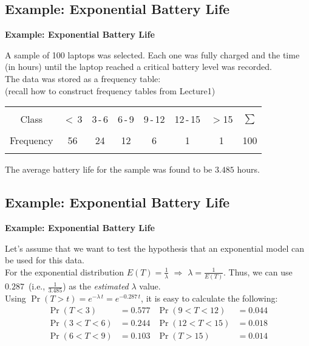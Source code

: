 \documentclass[compress]{beamer}        %
\makeatletter
\newcommand{\tcb}{\textcolor{beamer@blendedblue}}
\makeatother
\begin{document}
\subsection{Example: Exponential Battery Life}
\begin{frame}{\bf \tcb{Example: Exponential Battery Life}}

A sample of 100 laptops was selected. Each one was fully charged and the time (in hours) until the laptop reached a critical battery level was recorded.\\[0.8cm]

The data was stored as a frequency table:\\[0.1cm]
{\footnotesize(recall how to construct frequency tables from Lecture1)}
\begin{center}
\begin{tabular}{|c|cccccc|c|}
\hline
&&&&&&&\\[-0.3cm]
Class & $<$\,3 & 3\,-\,6 & 6\,-\,9 & 9\,-\,12 & 12\,-\,15 & $>$15 & $\sum$ \\[0.1cm]
\hline
&&&&&&&\\[-0.3cm]
Frequency & 56 & 24 & 12 &  6 &  1 &  1 & 100\\[0.1cm]
\hline
\multicolumn{8}{c}{}
\end{tabular}
\end{center}

The average battery life for the sample was found to be $3.485$ hours.

\end{frame}



\subsection{Example: Exponential Battery Life}
\begin{frame}{\bf \tcb{Example: Exponential Battery Life}}

Let's assume that we want to test the hypothesis that an exponential model can be used for this data.\\[0.4cm]

For the exponential distribution $E(T) = \frac{1}{\lambda}$ $\Rightarrow$ $\lambda = \frac{1}{E(T)}$. Thus, we can use $0.287$\, (i.e., $\frac{1}{3.485}$) as the \emph{estimated} $\lambda$ value.\\[1cm]

Using $\Pr(T>t) = e^{-\lambda\,t} = e^{-0.287\,t}$, it is easy to calculate the following:\\[-0.4cm]
\begin{align*}
\Pr(T < 3) &= 0.577  & \Pr(9 < T < 12) &= 0.044 \\[0.4cm]
\Pr(3 < T < 6) &= 0.244  & \Pr(12 < T < 15) &= 0.018 \\[0.4cm]
\Pr(6 < T < 9) &= 0.103  & \Pr(T > 15) &= 0.014
\end{align*}

\end{frame}
\end{document}
